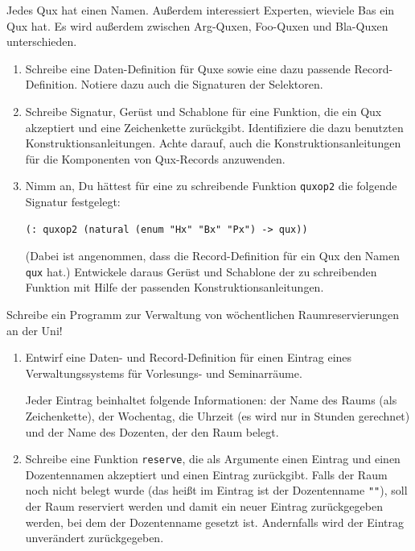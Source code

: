 \begin{aufgabe}

  Jedes Qux hat einen Namen.  Außerdem interessiert
  Experten, wieviele Bas ein Qux hat.  Es wird außerdem zwischen
  Arg-Quxen, Foo-Quxen und Bla-Quxen unterschieden.
  \begin{enumerate}
  \item Schreibe eine Daten-Definition für Quxe sowie eine dazu
    passende Record-Definition. Notiere dazu auch die Signaturen der
    Selektoren.
  \item Schreibe Signatur, Gerüst und Schablone für eine Funktion,
    die ein Qux akzeptiert und eine Zeichenkette zurückgibt.
    Identifiziere die dazu benutzten Konstruktionsanleitungen.
    Achte darauf, auch die Konstruktionsanleitungen für die
    Komponenten von Qux-Records anzuwenden.
  \item Nimm an, Du hättest für eine zu schreibende Funktion
    \lstinline{quxop2} die folgende Signatur festgelegt:
\begin{lstlisting}
(: quxop2 (natural (enum "Hx" "Bx" "Px") -> qux))
\end{lstlisting}
    (Dabei ist angenommen, dass die Record-Definition für ein Qux
    den Namen \lstinline{qux} hat.) Entwickele daraus Gerüst und
    Schablone der zu schreibenden Funktion mit Hilfe der
    passenden Konstruktionsanleitungen.
  \end{enumerate}

\end{aufgabe}

\begin{aufgabe}

  Schreibe ein Programm zur Verwaltung von wöchentlichen
  Raumreservierungen an der Uni!

  \begin{enumerate}
  \item Entwirf eine Daten- und Record-Definition für einen Eintrag eines
    Verwaltungssystems für Vorlesungs- und Seminarräume.

    Jeder Eintrag beinhaltet
    folgende Informationen: der Name des Raums (als Zeichenkette), der Wochentag,
    die Uhrzeit (es wird nur in Stunden gerechnet) und der Name des Dozenten, der
    den Raum belegt.

  \item Schreibe eine Funktion \lstinline{reserve}, die als Argumente einen Eintrag und einen
    Dozentennamen akzeptiert und einen Eintrag zurückgibt. Falls der Raum noch nicht belegt
    wurde (das heißt im Eintrag ist der Dozentenname \lstinline{""}), soll der Raum reserviert werden und
    damit ein neuer Eintrag zurückgegeben werden, bei dem der Dozentenname gesetzt ist.
    Andernfalls wird der Eintrag unverändert zurückgegeben.
  \end{enumerate}
\end{aufgabe}


